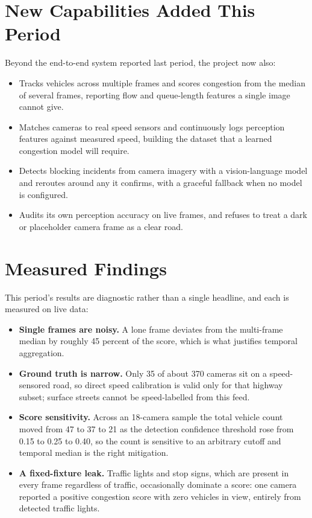 \documentclass[12pt]{article}
\begin{document}
\section{New Capabilities Added This Period}

Beyond the end-to-end system reported last period, the project now also:

\begin{itemize}[leftmargin=1.6em, itemsep=3pt]
  \item Tracks vehicles across multiple frames and scores congestion from the
    median of several frames, reporting flow and queue-length features a single
    image cannot give.
  \item Matches cameras to real speed sensors and continuously logs perception
    features against measured speed, building the dataset that a learned
    congestion model will require.
  \item Detects blocking incidents from camera imagery with a vision-language
    model and reroutes around any it confirms, with a graceful fallback when no
    model is configured.
  \item Audits its own perception accuracy on live frames, and refuses to treat a
    dark or placeholder camera frame as a clear road.
\end{itemize}

\section{Measured Findings}

This period's results are diagnostic rather than a single headline, and each is
measured on live data:

\begin{itemize}[leftmargin=1.6em, itemsep=3pt]
  \item \textbf{Single frames are noisy.} A lone frame deviates from the
    multi-frame median by roughly 45 percent of the score, which is what justifies
    temporal aggregation.
  \item \textbf{Ground truth is narrow.} Only 35 of about 370 cameras sit on a
    speed-sensored road, so direct speed calibration is valid only for that
    highway subset; surface streets cannot be speed-labelled from this feed.
  \item \textbf{Score sensitivity.} Across an 18-camera sample the total vehicle
    count moved from 47 to 37 to 21 as the detection confidence threshold rose
    from 0.15 to 0.25 to 0.40, so the count is sensitive to an arbitrary cutoff
    and temporal median is the right mitigation.
  \item \textbf{A fixed-fixture leak.} Traffic lights and stop signs, which are
    present in every frame regardless of traffic, occasionally dominate a score:
    one camera reported a positive congestion score with zero vehicles in view,
    entirely from detected traffic lights.
\end{itemize}
\end{document}
